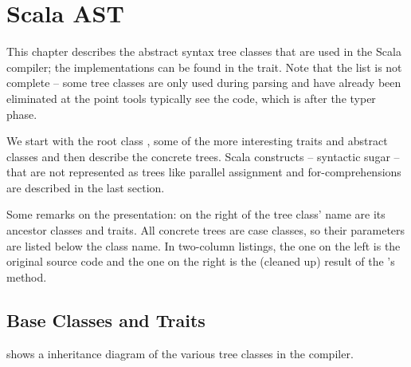 \chapter{Scala AST} \label{chapter:scala-ast}

This chapter describes the abstract syntax tree classes that are used in the Scala compiler; the implementations can be found in the  trait. Note that the list is not complete -- some tree classes are only used during parsing and have already been eliminated at the point tools typically see the code, which is after the typer phase.

We start with the root class , some of the more interesting traits and abstract classes and then describe the concrete trees. Scala constructs -- syntactic sugar -- that are not represented as trees like parallel assignment and for-comprehensions are described in the last section.

Some remarks on the presentation: on the right of the tree class' name are its ancestor classes and traits. All concrete trees are case classes, so their parameters are listed below the class name. In two-column listings, the one on the left is the original source code and the one on the right is the (cleaned up) result of the 's  method.

\newcommand{\member} [2] {\hfill \begin{footnotesize}\src{#1} \newline \vspace{5pt} \src{#2}\end{footnotesize}\vspace{5pt}}

\section{Base Classes and Traits}

 shows a inheritance diagram of the various tree classes in the compiler.

